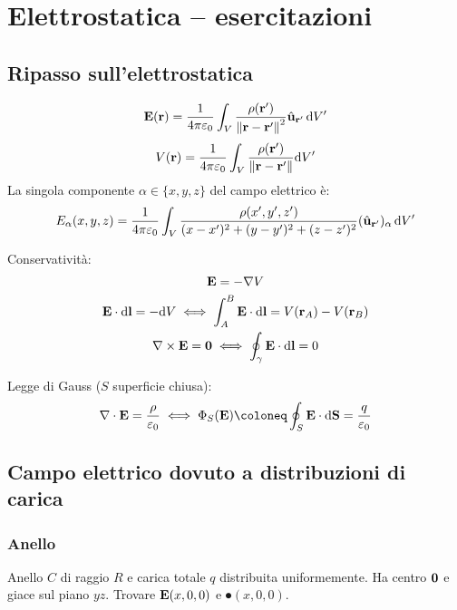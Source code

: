 \chapter{Elettrostatica -- esercitazioni}

\section{Ripasso sull'elettrostatica}

\begin{equation}
    \mathbf{E}(\mathbf{r}) = \frac{1}{4\pi\varepsilon_0} \int_V \frac{\rho(\mathbf{r}')}{\left\lVert \mathbf{r} - \mathbf{r}' \right\rVert^2} \hat{\mathbf{u}}_{\mathbf{r}'} \, \mathrm{d} V'
\end{equation}
\begin{equation}
    V(\mathbf{r}) = \frac{1}{4\pi\varepsilon_0} \int_V \frac{\rho(\mathbf{r}')}{\left\lVert \mathbf{r} - \mathbf{r}' \right\rVert} \mathrm{d} V'
\end{equation}
La singola componente $\alpha \in \{x, y, z\}$ del campo elettrico è:
\begin{equation}
    E_\alpha(x,y,z) = \frac{1}{4\pi\varepsilon_0} \int_V \frac{\rho(x',y',z')}{(x - x')^2 + (y - y')^2 + (z - z')^2} (\hat{\mathbf{u}}_{\mathbf{r}'})_\alpha \, \mathrm{d} V'
\end{equation}

Conservatività:
\begin{gather}
    \mathbf{E} = - \nabla V \\
    \mathbf{E} \cdot \mathrm{d} \mathbf{l} = - \mathrm{d} V \iff \int_A^B \mathbf{E} \cdot \mathrm{d} \mathbf{l} = V(\mathbf{r}_A) - V(\mathbf{r}_B) \\
    \nabla \times \mathbf{E} = \mathbf{0}
    \iff
    \oint_\gamma \mathbf{E} \cdot \mathrm{d} \mathbf{l} = 0
\end{gather}

Legge di Gauss ($S$ superficie chiusa):
\begin{equation}
    \diver \E = \frac{\rho}{\eps_0}
    \iff
    \Phi_S(\E) \coloneq \oint_S \E \sde = \frac{q}{\eps_0}
\end{equation}

\section{Campo elettrico dovuto a distribuzioni di carica}

\subsection{Anello}


Anello $C$ di raggio $R$ e carica totale $q$ distribuita uniformemente.
Ha centro $\mathbf{0}$ e giace sul piano $yz$.
Trovare $\mathbf{E}(x, 0, 0)$ e $\spot(x, 0, 0)$.

